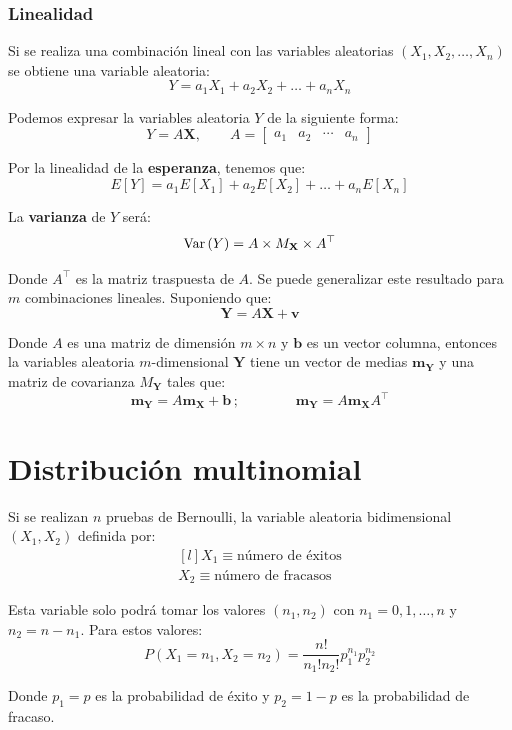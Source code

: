 \documentclass[a4paper]{book}
\renewcommand{\vec}[1]{\mathbf{#1}} %
\begin{document}
\subsubsection{Linealidad}
Si se realiza una combinación lineal con las variables aleatorias $\left( X_1,X_2, \dots , X_n \right)$ se obtiene una variable aleatoria:
\[ Y = a_1X_1 + a_2X_2 + \dots + a_nX_n \]

Podemos expresar la variables aleatoria $Y$ de la siguiente forma:
\[ Y = A \vec{X}, \qquad A = \left[
		\begin{matrix}
			a_1 & a_2 & \cdots & a_n
		\end{matrix} \right] \]

Por la linealidad de la \textbf{esperanza}, tenemos que:
\[ E \left[ Y \right] = a_1E \left[ X_1 \right] + a_2 E \left[ X_2 \right] + \dots + a_n E \left[ X_n \right] \]

La \textbf{varianza} de $Y$ será:
\[ \Var \left( Y \right) = A \times M_{\vec{X}} \times A ^{\top} \]

Donde $A ^{\top} $ es la matriz traspuesta de $A$. Se puede generalizar este resultado para $m$ combinaciones lineales. Suponiendo que:
\[ \vec{Y} = A \vec{X} + \vec{v} \]

Donde $A$ es una matriz de dimensión $m \times n$ y $\vec{b}$ es un vector columna, entonces la variables aleatoria $m$-dimensional $\vec{Y}$ tiene un vector de medias $\vec{m}_{\vec{Y}}$ y una matriz de covarianza $M_{\vec{Y}}$ tales que:
\[ \vec{m}_{\vec{Y}} = A \vec{m}_{\vec{X}} + \vec{b} \, ; \qquad \qquad \vec{m}_{\vec{Y}} = A \vec{m}_{\vec{X}} A ^{\top} \]

\section{Distribución multinomial}

Si se realizan $n$ pruebas de Bernoulli, la variable aleatoria bidimensional $\left( X_1, X_2 \right)$ definida por:
\[ \begin{matrix*}[l]
		X_1 \equiv \text{número de éxitos}\\[5pt]
		X_2 \equiv \text{número de fracasos}
	\end{matrix*} \]

Esta variable solo podrá tomar los valores $\left( n_1, n_2 \right)$ con $n_1 = 0,1, \dots , n$ y $n_2 = n - n_1$. Para estos valores:
\[ P \left( X_1 = n_1, X_2 = n_2 \right) = \frac{n!}{n_1!n_2!} p_1^{n_1} p_2^{n_2}\]

Donde $p_1 = p$ es la probabilidad de éxito y $p_2 = 1-p$ es la probabilidad de fracaso.
\end{document}
